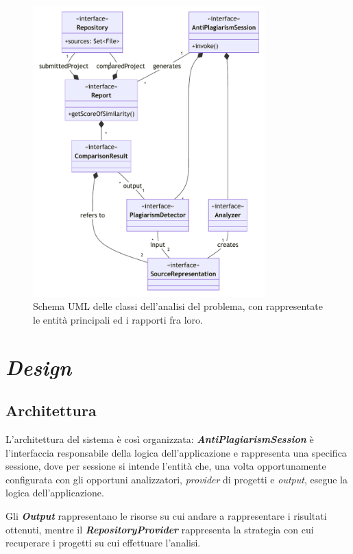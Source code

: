 \begin{figure}[h!]
    \centering
    \includegraphics[width=0.8\textwidth]{resources/img/02-domain.pdf}
    \caption{Schema UML delle classi dell'analisi del problema, con rappresentate le entità principali ed i rapporti fra loro.}
    \label{img:02-domain}
\end{figure}

\section{\textit{Design}}

\subsection{Architettura}
L'architettura del sistema è così organizzata: \textbf{\textit{AntiPlagiarismSession}} è l'interfaccia responsabile della logica dell'applicazione e rappresenta una specifica sessione, dove per sessione si intende l'entità che, una volta opportunamente configurata con gli opportuni analizzatori, \textit{provider} di progetti e \textit{output}, esegue la logica dell'applicazione.

Gli \textbf{\textit{Output}} rappresentano le risorse su cui andare a rappresentare i risultati ottenuti, mentre il \textbf{\textit{RepositoryProvider}} rappresenta la strategia con cui recuperare i progetti su cui effettuare l'analisi.

